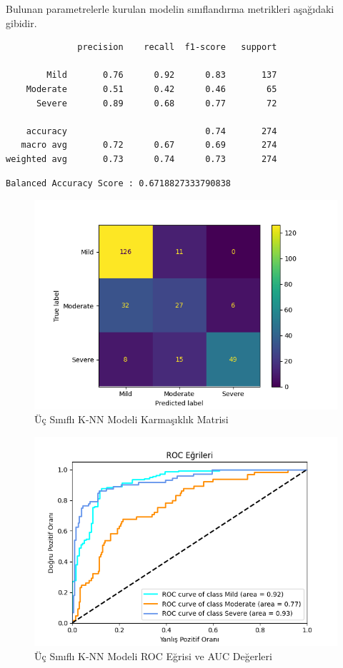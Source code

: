 \documentclass[12pt,twoside]{deuthesis}
\begin{document}
Bulunan parametrelerle kurulan modelin sınıflandırma metrikleri aşağıdaki gibidir.
\begin{verbatim}
              precision    recall  f1-score   support

        Mild       0.76      0.92      0.83       137
    Moderate       0.51      0.42      0.46        65
      Severe       0.89      0.68      0.77        72

    accuracy                           0.74       274
   macro avg       0.72      0.67      0.69       274
weighted avg       0.73      0.74      0.73       274
\end{verbatim}
\begin{verbatim}
Balanced Accuracy Score : 0.6718827333790838
\end{verbatim}
\begin{figure}

{\centering \includegraphics[width=1.05\linewidth,height=0.6\textheight]{figure/knn_conf} 

}

\caption{Üç Sınıflı K-NN Modeli Karmaşıklık Matrisi}\label{fig:unnamed-chunk-26}
\end{figure}
\begin{figure}

{\centering \includegraphics[width=1.05\linewidth,height=0.6\textheight]{figure/roc_curve_KNeighborsClassifier} 

}

\caption{Üç Sınıflı K-NN Modeli ROC Eğrisi ve AUC Değerleri}\label{fig:unnamed-chunk-27}
\end{figure}
\end{document}
